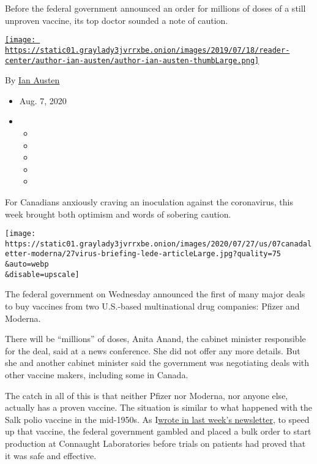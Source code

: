 Before the federal government announced an order for millions of doses
of a still unproven vaccine, its top doctor sounded a note of caution.

\href{https://www.nytimes3xbfgragh.onion/by/ian-austen}{\texttt{[image: https://static01.graylady3jvrrxbe.onion/images/2019/07/18/reader-center/author-ian-austen/author-ian-austen-thumbLarge.png]}}

By \href{https://www.nytimes3xbfgragh.onion/by/ian-austen}{Ian Austen}

\begin{itemize}
\item
  Aug. 7, 2020
\item
  \begin{itemize}
  \item
  \item
  \item
  \item
  \item
  \end{itemize}
\end{itemize}

For Canadians anxiously craving an inoculation against the coronavirus,
this week brought both optimism and words of sobering caution.

\texttt{[image: https://static01.graylady3jvrrxbe.onion/images/2020/07/27/us/07canadaletter-moderna/27virus-briefing-lede-articleLarge.jpg?quality=75\\\&auto=webp\\\&disable=upscale]}

The federal government on Wednesday announced the first of many major
deals to buy vaccines from two U.S.-based multinational drug companies:
Pfizer and Moderna.

There will be ``millions'' of doses, Anita Anand, the cabinet minister
responsible for the deal, said at a news conference. She did not offer
any more details. But she and another cabinet minister said the
government was negotiating deals with other vaccine makers, including
some in Canada.

The catch in all of this is that neither Pfizer nor Moderna, nor anyone
else, actually has a proven vaccine. The situation is similar to what
happened with the Salk polio vaccine in the mid-1950s. As
I\href{https://www.nytimes3xbfgragh.onion/2020/07/31/world/canada/leone-farrell-chemist.html}{wrote
in last week's newsletter}, to speed up that vaccine, the federal
government gambled and placed a bulk order to start production at
Connaught Laboratories before trials on patients had proved that it was
safe and effective.

